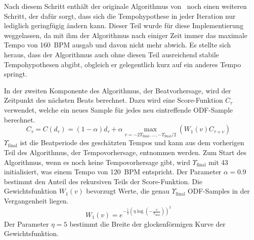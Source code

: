 {{{			%
			Nach diesem Schritt enthält der originale Algorithmus von~\cite{2009_DaPlSt} noch einen weiteren Schritt,
				der dafür sorgt,
				dass sich die Tempohypothese in jeder Iteration nur lediglich geringfügig ändern kann.
			Dieser Teil wurde für diese Implementierung weggelassen,
				da mit ihm der Algorithmus nach einiger Zeit immer das maximale Tempo von \SI{160}{BPM} ausgab
				und davon nicht mehr abwich. 
			Es stellte sich heraus,
				dass der Algorithmus auch ohne diesen Teil ausreichend stabile Tempohypothesen abgibt,
				obgleich er gelegentlich kurz auf ein anderes Tempo springt.

			In der zweiten Komponente des Algorithmus,
				der Beatvorhersage,
				wird der Zeitpunkt des nächsten Beats berechnet.
			Dazu wird eine Score-Funktion $C_\tau$ verwendet,
				welche ein neues Sample für jedes neu eintreffende ODF-Sample berechnet.
			\begin{equation}
				C_\tau = C(d_\tau) =
					(1 - \alpha)d_\tau +
					\alpha \max_{v = -2 \Upsilon_\text{final}, ..., -\Upsilon_\text{final} / 2}(W_1(v) C_{\tau + v})
				\label{eq:score_function}
			\end{equation}
			$\Upsilon_\text{final}$ ist die Beatperiode des geschätzten Tempos
				und kann aus dem vorherigen Teil des Algorithmus, der Tempovorhersage, entnommen werden.
			Zum Start des Algorithmus,
				wenn es noch keine Tempovorhersage gibt,
				wird $\Upsilon_\text{final}$ mit \num{43} initialisiert,
				was einem Tempo von \SI{120}{BPM} entspricht.
			Der Parameter $\alpha = 0.9$ bestimmt den Anteil des rekursiven Teils der Score-Funktion.
			Die Gewichtsfunktion $W_1(v)$ bevorzugt Werte, die genau $\Upsilon_\text{final}$ ODF-Samples in der Vergangenheit liegen.
			\begin{equation}
				W_1(v) = e^{-\frac{1}{2} \left( \eta \log \left( -\frac{v}{\Upsilon_\text{final}} \right) \right)^2}
			\end{equation}
			Der Parameter $\eta = 5$ bestimmt die Breite der glockenförmigen Kurve der Gewichtsfunktion.

}}}

